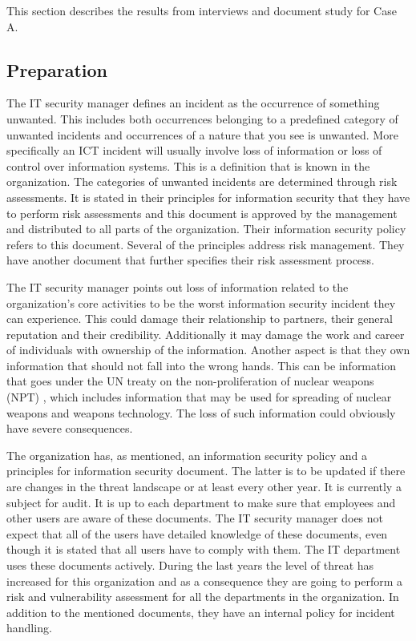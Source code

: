 This section describes the results from interviews and document study for Case A. 

\subsection{Preparation}
The IT security manager defines an incident %
as the occurrence of something unwanted. This includes both occurrences belonging to a predefined category of unwanted incidents and occurrences of a nature that you see is unwanted. More specifically an \ac{ICT} incident will usually involve loss of information or loss of control over information systems. This is a definition that is known in the organization. The categories of unwanted incidents are determined through risk assessments. It is stated in their principles for information security that they have to perform risk assessments and this document is approved by the management and distributed to all parts of the organization. Their information security policy refers to this document. Several of the principles address risk management. They have another document that further specifies their risk assessment process. %

The IT security manager points out loss of information related to the organization's core activities to be the worst information security incident they can experience. This could damage their relationship to partners, their general reputation and their credibility. Additionally it may damage the work and career of individuals with ownership of the information. %
Another aspect is that they own information that should not fall into the wrong hands. This can be information that goes under the \ac{UN} treaty on the non-proliferation of nuclear weapons (NPT) \cite{NPT}, which includes information that may be used for spreading of nuclear weapons and weapons technology. %
The loss of such information could obviously have severe consequences.

The organization has, as mentioned, an information security policy and a principles for information security document. The latter is to be updated if there are changes in the threat landscape or at least every other year. It is currently a subject for audit. It is up to each department to make sure that employees and other users are aware of these documents. The IT security manager does not expect that all of the users have detailed knowledge of these documents, even though it is stated that all users have to comply with them. The IT department uses these documents actively. %
During the last years the level of threat has increased for this organization and as a consequence they are going to perform a risk and vulnerability assessment for all the departments in the organization. In addition to the mentioned documents, they have an internal policy for incident handling.

